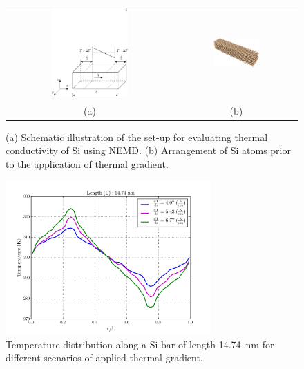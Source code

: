  
\begin{figure}[p]
\begin{center}
\begin{tabular}{cc}
  \includegraphics[width=0.48\textwidth]{./Figures/schematic}
  &
  \hspace{3mm}
  \includegraphics[width=0.40\textwidth]{./Figures/Sibar_05}
  \\ (a) & (b)
  \end{tabular}
\caption{(a) Schematic illustration of the set-up for evaluating thermal conductivity of Si using NEMD. (b) 
Arrangement of Si atoms prior to the application of thermal gradient.}
\label{fig:setup}
\end{center}
\end{figure}

\clearpage


\begin{figure}[p]
 \begin{center}
  \includegraphics[width=0.70\textwidth]{./Figures/temp_plot}
\caption{Temperature distribution along a Si bar of length 14.74~nm for different scenarios of applied 
thermal gradient.}
\label{fig:kapitza}
\end{center}
\end{figure}


